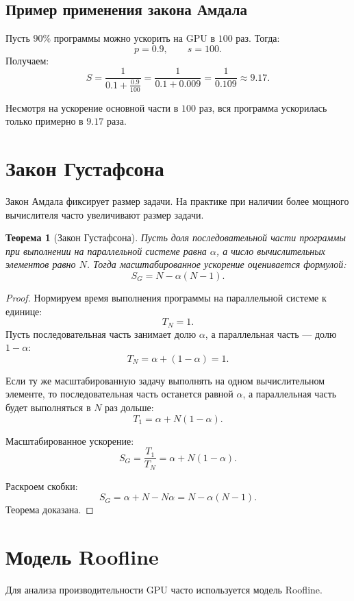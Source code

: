 \documentclass[12pt,a4paper]{article}
\newtheorem{theorem}{Теорема}
\begin{document}
\subsection{Пример применения закона Амдала}

Пусть $90\%$ программы можно ускорить на GPU в $100$ раз. Тогда:
\[
    p = 0.9,\qquad s = 100.
\]
Получаем:
\[
    S = \frac{1}{0.1 + \frac{0.9}{100}}
      = \frac{1}{0.1 + 0.009}
      = \frac{1}{0.109}
      \approx 9.17.
\]

Несмотря на ускорение основной части в $100$ раз, вся программа ускорилась только примерно в $9.17$ раза.

\section{Закон Густафсона}

Закон Амдала фиксирует размер задачи. На практике при наличии более мощного вычислителя часто увеличивают размер задачи.

\begin{theorem}[Закон Густафсона]
Пусть доля последовательной части программы при выполнении на параллельной системе равна $\alpha$, а число вычислительных элементов равно $N$. Тогда масштабированное ускорение оценивается формулой:
\[
    S_G = N - \alpha(N-1).
\]
\end{theorem}

\begin{proof}
Нормируем время выполнения программы на параллельной системе к единице:
\[
    T_N = 1.
\]
Пусть последовательная часть занимает долю $\alpha$, а параллельная часть --- долю $1-\alpha$:
\[
    T_N = \alpha + (1-\alpha) = 1.
\]

Если ту же масштабированную задачу выполнять на одном вычислительном элементе, то последовательная часть останется равной $\alpha$, а параллельная часть будет выполняться в $N$ раз дольше:
\[
    T_1 = \alpha + N(1-\alpha).
\]

Масштабированное ускорение:
\[
    S_G = \frac{T_1}{T_N}
        = \alpha + N(1-\alpha).
\]

Раскроем скобки:
\[
    S_G = \alpha + N - N\alpha
        = N - \alpha(N-1).
\]
Теорема доказана.
\end{proof}

\section{Модель Roofline}

Для анализа производительности GPU часто используется модель Roofline.
\end{document}
